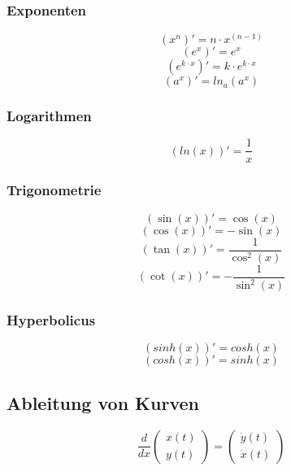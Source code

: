 \subsubsection{Exponenten}
\[ \boxed{ (x^n)' = n\cdot x^{(n-1)} } \]
\[ \boxed{ (e^x)' = e^x } \]
\[ \boxed{ (e^{k\cdot x})' = k \cdot e^{k\cdot x} } \]
\[ \boxed{ (a^x)' = ln_a (a^x) } \]

\subsubsection{Logarithmen}
\[ \boxed{ (ln(x))' = \frac{1}{x} } \]  

\subsubsection{Trigonometrie}
\[ \boxed{ (\sin(x))' = \cos(x) } \]  
\[ \boxed{ (\cos(x))' = -\sin(x) } \] 
\[ \boxed{ (\tan(x))' = \frac{1}{\cos^2(x)} } \]  
\[ \boxed{ (\cot(x))' = -\frac{1}{\sin^2(x)} } \]

\subsubsection{Hyperbolicus}
\[ \boxed{(sinh(x))' = cosh(x)} \]
\[ \boxed{(cosh(x))' = sinh(x)} \]

\subsection{Ableitung von Kurven}
\[ \boxed{\frac{d}{dx}\left(\begin{matrix}x(t)\\y(t)\end{matrix}\right) = \left(\begin{matrix}\dot{y}(t)\\\dot{x}(t)\end{matrix}\right)} \]